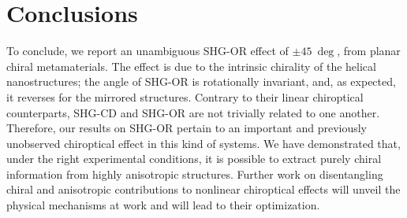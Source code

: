 \section{Conclusions}\label{sec:results:OAinPlanarNanohelices:conclusions}
To conclude, we report an unambiguous SHG-OR effect of $\pm \SI{45}{\deg}$, from planar chiral metamaterials. The effect is due to the intrinsic chirality of the helical nanostructures; the angle of SHG-OR is rotationally invariant, and, as expected, it reverses for the mirrored structures. Contrary to their linear chiroptical counterparts, SHG-CD and SHG-OR are not trivially related to one another. Therefore, our results on SHG-OR pertain to an important and previously unobserved chiroptical effect in this kind of systems. We have demonstrated that, under the right experimental conditions, it is possible to extract purely chiral information from highly anisotropic structures. Further work on disentangling chiral and anisotropic contributions to nonlinear chiroptical effects will unveil the physical mechanisms at work and will lead to their optimization. 